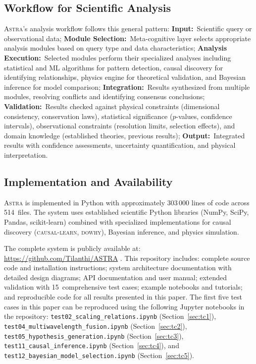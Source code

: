 \documentclass[fleqn,usenatbib]{mnras}
\newcommand{\astra}{\textsc{Astra}\xspace}
\begin{document}
\subsection{Workflow for Scientific Analysis}
\label{sec:methods:workflow}

\astra's analysis workflow follows this general pattern:
\textbf{Input:}~Scientific query or observational data;
\textbf{Module Selection:}~Meta-cognitive layer selects appropriate analysis modules based on query type and data characteristics;
\textbf{Analysis Execution:}~Selected modules perform their specialized analyses including statistical and ML algorithms for pattern detection, causal discovery for identifying relationships, physics engine for theoretical validation, and Bayesian inference for model comparison;
\textbf{Integration:}~Results synthesized from multiple modules, resolving conflicts and identifying consensus conclusions;
\textbf{Validation:}~Results checked against physical constraints (dimensional consistency, conservation laws), statistical significance ($p$-values, confidence intervals), observational constraints (resolution limits, selection effects), and domain knowledge (established theories, previous results);
\textbf{Output:}~Integrated results with confidence assessments, uncertainty quantification, and physical interpretation.

\subsection{Implementation and Availability}
\label{sec:methods:implementation}

\astra is implemented in Python with approximately 303\,000 lines of code across 514~files.
The system uses established scientific Python libraries (NumPy, SciPy, Pandas, scikit-learn) combined with specialized implementations for causal discovery (\textsc{causal-learn}, \textsc{dowhy}), Bayesian inference, and physics simulation.

The complete system is publicly available at: \url{https://github.com/Tilanthi/ASTRA} \citep{WhiteDey2026}.
This repository includes: complete source code and installation instructions; system architecture documentation with detailed design diagrams; API documentation and user manual; extended validation with 15~comprehensive test cases; example notebooks and tutorials; and reproducible code for all results presented in this paper.
The first five test cases in this paper can be reproduced using the following Jupyter notebooks in the repository:
\texttt{test02\_scaling\_relations.ipynb} (Section~\ref{sec:tc1}),
\texttt{test04\_multiwavelength\_fusion.ipynb} (Section~\ref{sec:tc2}),
\texttt{test05\_hypothesis\_generation.ipynb} (Section~\ref{sec:tc3}),
\texttt{test11\_causal\_inference.ipynb} (Section~\ref{sec:tc4}), and
\texttt{test12\_bayesian\_model\_selection.ipynb} (Section~\ref{sec:tc5}).
\end{document}
